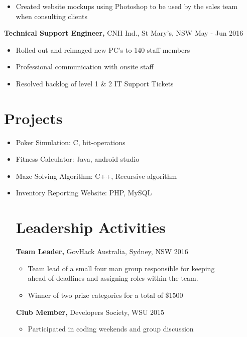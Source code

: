 \documentclass[margin]{res}
\begin{document}
\begin{resume}
\begin{itemize}
 \item Created website mockups using Photoshop to be used by the sales team \\
      when consulting clients
 \end{itemize}

{\bf Technical Support Engineer,} CNH Ind., St Mary's, NSW \hfill  May - Jun 2016
\begin{itemize} \itemsep -2pt %
\item Rolled out and reimaged new PC's to 140 staff members
\item Professional communication with onsite staff
\item Resolved backlog of level 1 \& 2 IT Support Tickets
\end{itemize}

\section{Projects}
                  \begin{itemize} \itemsep -2pt
                  \item Poker Simulation: C, bit-operations
                  \item Fitness Calculator: Java, android studio
                  \item Maze Solving Algorithm: C++, Recursive algorithm
                  \item Inventory Reporting Website: PHP, MySQL

\section{Leadership   Activities}
               {\bf Team Leader,} GovHack Australia, Sydney, NSW    \hfill        2016
                \begin{itemize} \itemsep -2pt
              \item Team lead of a small four man group responsible for keeping \\
                    ahead of deadlines and assigning roles within the team.

              \item Winner of two prize categories for a total of {\$}1500

		 \end{itemize}

		{\bf Club Member,} Developers Society, WSU \hfill   2015
                \begin{itemize} \itemsep -2pt
                 \item Participated in coding weekends and group discussion


\end{itemize}
\end{itemize}
\end{resume}
\end{document}

